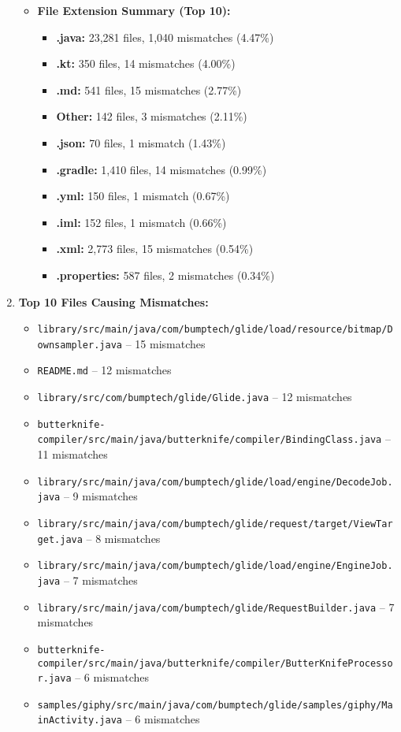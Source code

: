 \documentclass[12pt,a4paper]{article}
\begin{document}
\begin{enumerate}
\begin{itemize}
        \item \textbf{File Extension Summary (Top 10):}  
            \begin{itemize}
                \item \textbf{.java:} 23,281 files, 1,040 mismatches (4.47\%)  
                \item \textbf{.kt:} 350 files, 14 mismatches (4.00\%)  
                \item \textbf{.md:} 541 files, 15 mismatches (2.77\%)  
                \item \textbf{Other:} 142 files, 3 mismatches (2.11\%)  
                \item \textbf{.json:} 70 files, 1 mismatch (1.43\%)  
                \item \textbf{.gradle:} 1,410 files, 14 mismatches (0.99\%)  
                \item \textbf{.yml:} 150 files, 1 mismatch (0.67\%)  
                \item \textbf{.iml:} 152 files, 1 mismatch (0.66\%)  
                \item \textbf{.xml:} 2,773 files, 15 mismatches (0.54\%)  
                \item \textbf{.properties:} 587 files, 2 mismatches (0.34\%)  
            \end{itemize}
    \end{itemize}

    \item \textbf{Top 10 Files Causing Mismatches:}  
        \begin{itemize}
            \item \texttt{library/src/main/java/com/bumptech/glide/load/resource/bitmap/Downsampler.java} -- 15 mismatches  
            \item \texttt{README.md} -- 12 mismatches  
            \item \texttt{library/src/com/bumptech/glide/Glide.java} -- 12 mismatches  
            \item \texttt{butterknife-compiler/src/main/java/butterknife/compiler/BindingClass.java} -- 11 mismatches  
            \item \texttt{library/src/main/java/com/bumptech/glide/load/engine/DecodeJob.java} -- 9 mismatches  
            \item \texttt{library/src/main/java/com/bumptech/glide/request/target/ViewTarget.java} -- 8 mismatches  
            \item \texttt{library/src/main/java/com/bumptech/glide/load/engine/EngineJob.java} -- 7 mismatches  
            \item \texttt{library/src/main/java/com/bumptech/glide/RequestBuilder.java} -- 7 mismatches  
            \item \texttt{butterknife-compiler/src/main/java/butterknife/compiler/ButterKnifeProcessor.java} -- 6 mismatches  
            \item \texttt{samples/giphy/src/main/java/com/bumptech/glide/samples/giphy/MainActivity.java} -- 6 mismatches    
        \end{itemize}


\end{enumerate}
\end{document}
